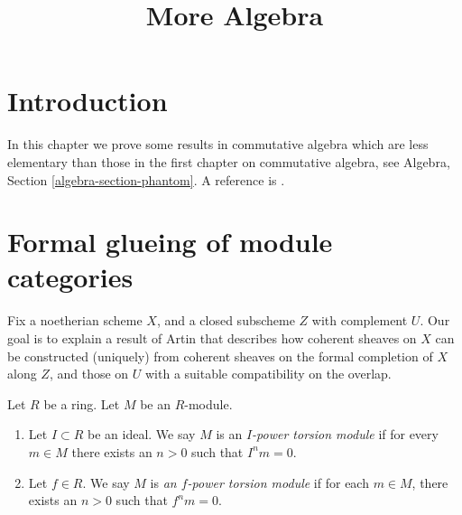 

%


\title{More Algebra}


\maketitle

\label{section-phantom}

\tableofcontents



\section{Introduction}
\label{section-introduction}

\noindent
In this chapter we prove some results in commutative algebra which
are less elementary than those in the first chapter on commutative
algebra, see
Algebra, Section \ref{algebra-section-phantom}.
A reference is \cite{MatCA}.







\section{Formal glueing of module categories}
\label{section-formal-glueing}

\noindent
Fix a noetherian scheme $X$, and a closed subscheme $Z$ with complement $U$. 
Our goal is to explain a result of Artin that describes how coherent sheaves on 
$X$ can be constructed (uniquely) from coherent sheaves on the formal 
completion of $X$ along $Z$, and those on $U$ with a suitable compatibility on 
the overlap.

\begin{definition}
\label{definition-f-power-torsion}
Let $R$ be a ring. Let $M$ be an $R$-module.
\begin{enumerate}
\item Let $I \subset R$ be an ideal. We say $M$ is an
{\it $I$-power torsion module} if for every $m \in M$ there exists an $n > 0$
such that $I^n m = 0$.
\item Let $f \in R$. We say $M$ is 
{\it an $f$-power torsion module} if for each 
$m \in M$, there exists an $n > 0$ such that $f^n m = 0$.
\end{enumerate}
\end{definition}

